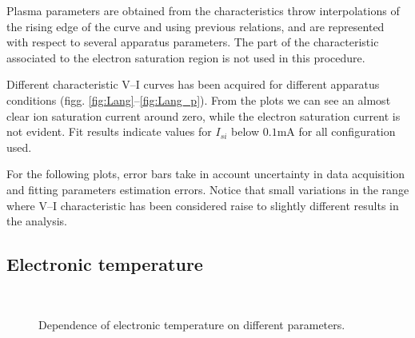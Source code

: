 \documentclass[11pt,a4 paper]{article}
\begin{document}
Plasma parameters are obtained from the characteristics throw interpolations of the rising edge of the curve and using previous relations, and are represented with respect to several apparatus parameters. The part of the characteristic associated to the electron saturation region is not used in this procedure.

Different characteristic V--I curves has been acquired for different apparatus conditions (figg. \ref{fig:Lang}--\ref{fig:Lang_p}). From the plots we can see an almost clear ion saturation current around zero, while the electron saturation current is not evident. Fit results indicate values for $I_{si}$ below $0.1\si{\milli\ampere}$ for all configuration used.

For the following plots, error bars take in account uncertainty in data acquisition and fitting parameters estimation errors.
Notice that small variations in the  range where V--I characteristic has been considered raise to slightly different results in the analysis.

\subsection{Electronic temperature}
\begin{figure}[H]
\\%
 \caption{Dependence of electronic temperature on different parameters.}\label{fig:Te}%
\end{figure}%
\end{document}
